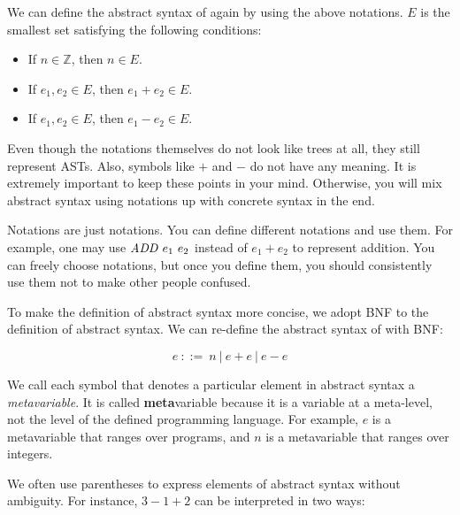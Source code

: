 We can define the abstract syntax of \lang again by using the above notations.
$E$ is the smallest set satisfying the following conditions:

\begin{itemize}
  \item If $n\in\mathbb{Z}$, then $n\in E$.
  \item If $e_1,e_2\in E$, then $e_1+e_2\in E$.
  \item If $e_1,e_2\in E$, then $e_1-e_2\in E$.
\end{itemize}

Even though the notations themselves do not look like trees at all, they still
represent ASTs. Also, symbols like $+$ and $-$ do not have any meaning. It
is extremely important to keep these points in your mind. Otherwise, you will
mix abstract syntax using notations up with concrete syntax in the end.

Notations are just notations. You can define different notations and use them.
For example, one may use $\mbox{\emph{ADD}}\ e_1\ e_2$ instead of $e_1 + e_2$ to represent
addition. You can freely choose notations, but once you define them, you should
consistently use them not to make other people confused.

To make the definition of abstract syntax more concise, we adopt BNF to the
definition of abstract syntax. We can re-define the abstract syntax of \lang with
BNF:

\[e\ ::=\ n\ |\ e+e\ |\ e-e\]

We call each symbol that denotes a particular element in abstract syntax a
\textit{metavariable}.
It is called \textbf{meta}variable because it is a variable at a
meta-level, not the level of the defined programming language. For example, $e$
is a metavariable that ranges over programs, and $n$ is a metavariable that
ranges over integers.

We often use parentheses to express elements of abstract syntax without
ambiguity. For instance, $3-1+2$ can be interpreted in two ways:

\begin{center}
\end{center}

